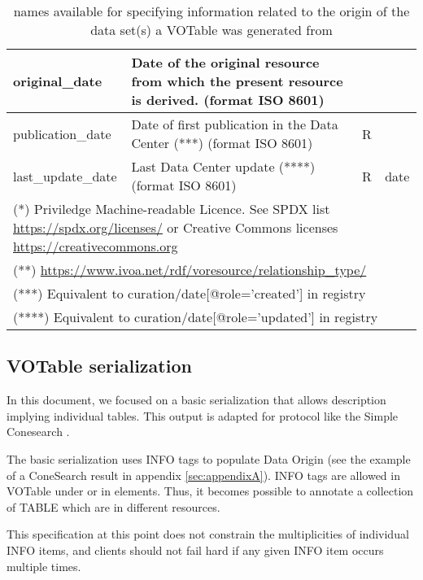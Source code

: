 \documentclass[11pt,a4paper]{ivoa}
\begin{document}
\begin{table}
\begin{tabular}{|l|p{5cm}|l|l|}
%
original\_date     & Date of the original resource from which the present resource is derived. (format ISO 8601) &    &  \\ \hline
publication\_date  & Date of first publication in the Data Center (***) (format ISO 8601) &  R &  \\ \hline
last\_update\_date & Last Data Center update (****) (format ISO 8601) & R & date\\ \hline
\multicolumn{4}{p{\textwidth}}{\footnotesize(*) Priviledge Machine-readable Licence.
See SPDX list \url{https://spdx.org/licenses/} or Creative Commons licenses \url{https://creativecommons.org}}\\
\multicolumn{4}{p{\textwidth}}{\footnotesize(**) \url{https://www.ivoa.net/rdf/voresource/relationship\_type/}}\\
\multicolumn{4}{p{\textwidth}}{\footnotesize(***) Equivalent to curation/date[@role='created'] in registry}\\
\multicolumn{4}{p{\textwidth}}{\footnotesize(****) Equivalent to curation/date[@role='updated'] in registry}
\end{tabular}
\caption{ names available for specifying information
related to the origin of the data set(s) a VOTable was generated from}
\label{tab:origin-names}
\end{table}


\subsection{VOTable serialization}

In this document, we focused on a basic serialization that allows description implying individual tables.
This output is adapted for protocol like the Simple Conesearch \citep{2008ivoa.specQ0222P}.

The basic serialization uses INFO tags to populate Data Origin (see the example of a ConeSearch result in appendix  \ref{sec:appendixA}).
INFO tags are allowed in VOTable under  or in  elements.
Thus, it becomes possible to annotate a collection of TABLE which are in different resources.

This specification at this point does not constrain the multiplicities of individual INFO items, and clients should not fail hard if any given INFO item occurs multiple times.
\end{document}
